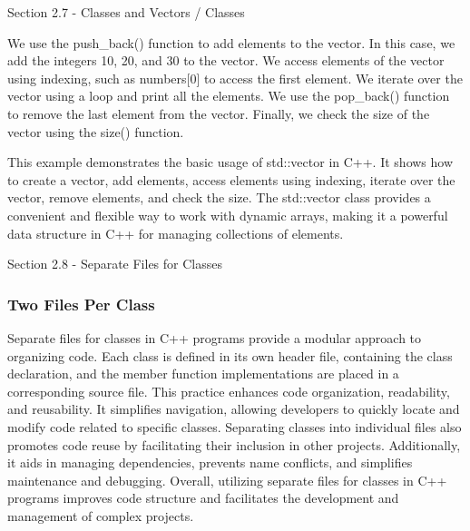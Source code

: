 \begin{notes}{Section 2.7 - Classes and Vectors / Classes}
\begin{highlight}
        We use the push\_back() function to add elements to the vector. In this case, we add the integers 10, 20, and 30 to the vector. We access elements of the vector using indexing, such as numbers[0] to access the first element. We iterate 
        over the vector using a loop and print all the elements. We use the pop\_back() function to remove the last element from the vector. Finally, we check the size of the vector using the size() function.
    
        This example demonstrates the basic usage of std::vector in C++. It shows how to create a vector, add elements, access elements using indexing, iterate over the vector, remove elements, and check the size. The std::vector class 
        provides a convenient and flexible way to work with dynamic arrays, making it a powerful data structure in C++ for managing collections of elements.
    \end{highlight}
\end{notes}

\begin{notes}{Section 2.8 - Separate Files for Classes}
    \subsubsection*{Two Files Per Class}

    Separate files for classes in C++ programs provide a modular approach to organizing code. Each class is defined in its own header file, containing the class declaration, and the member function implementations are placed in a corresponding source 
    file. This practice enhances code organization, readability, and reusability. It simplifies navigation, allowing developers to quickly locate and modify code related to specific classes. Separating classes into individual files also promotes code 
    reuse by facilitating their inclusion in other projects. Additionally, it aids in managing dependencies, prevents name conflicts, and simplifies maintenance and debugging. Overall, utilizing separate files for classes in C++ programs improves code 
    structure and facilitates the development and management of complex projects.
\end{notes}

